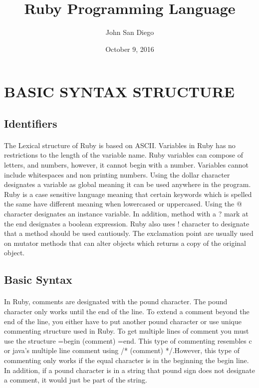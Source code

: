 \documentclass[11pt]{article}
\begin{document}
\title{Ruby Programming Language}
\author{John San Diego}
\date {October 9, 2016}
\maketitle

\newpage
\tableofcontents

\newpage
\section{BASIC SYNTAX STRUCTURE}
\subsection{Identifiers}
\paragraph{}
The Lexical structure of Ruby is based on ASCII. Variables in Ruby has no restrictions to the length of the variable name. Ruby variables can compose of letters, and numbers, however, it cannot begin with a number. Variables cannot include whitespaces and non printing numbers. Using the dollar character designates a variable as global meaning it can be used anywhere in the program. Ruby is a case sensitive language meaning that certain keywords which is spelled the same have different meaning when lowercased or uppercased. Using the @ character designates an instance variable. In addition, method with a ? mark at the end designates a boolean expression. Ruby also uses ! character to designate that a method should be used cautiously. The exclamation point are usually used on mutator methods that can alter objects which returns a copy of the original object.\cite{baba}

\subsection{Basic Syntax}
\paragraph{}
In Ruby, comments are designated with the pound character. The pound character only works until the end of the line. To extend a comment beyond the end of the line, you either have to put another pound character or use unique commenting structure used in Ruby. To get multiple lines of comment you must use the structure =begin  (comment) =end. This type of commenting resembles c or java's multiple line comment using  /* (comment) */.However, this type of commenting only works if the equal character is in the beginning the begin line. In addition, if a pound character is in a string that pound sign does not designate a comment, it would just be part of the string. \cite{Rutax}
\end{document}

